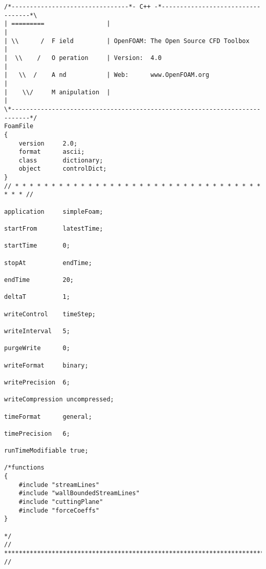 \begin{footnotesize}
\begin{verbatim}
/*--------------------------------*- C++ -*----------------------------------*\
| =========                 |                                                 |
| \\      /  F ield         | OpenFOAM: The Open Source CFD Toolbox           |
|  \\    /   O peration     | Version:  4.0                                   |
|   \\  /    A nd           | Web:      www.OpenFOAM.org                      |
|    \\/     M anipulation  |                                                 |
\*---------------------------------------------------------------------------*/
FoamFile
{
    version     2.0;
    format      ascii;
    class       dictionary;
    object      controlDict;
}
// * * * * * * * * * * * * * * * * * * * * * * * * * * * * * * * * * * * * * //

application     simpleFoam;

startFrom       latestTime;

startTime       0;

stopAt          endTime;

endTime         20;

deltaT          1;

writeControl    timeStep;

writeInterval   5;

purgeWrite      0;

writeFormat     binary;

writePrecision  6;

writeCompression uncompressed;

timeFormat      general;

timePrecision   6;

runTimeModifiable true;

/*functions
{
    #include "streamLines"
    #include "wallBoundedStreamLines"
    #include "cuttingPlane"
    #include "forceCoeffs"
}

*/
// ************************************************************************* //

\end{verbatim}
\end{footnotesize}